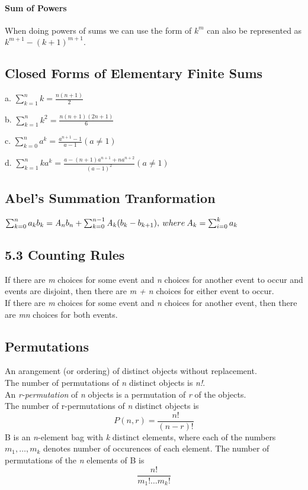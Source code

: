\documentclass[10pt,twocolumn]{article}
\newenvironment{packed_list}{
\begin{itemize}
  \setlength{\itemsep}{1pt}
  \setlength{\parskip}{0pt}
  \setlength{\parsep}{0pt}
}{\end{itemize}}
\begin{document}
	\paragraph*{Sum of Powers}
	When doing powers of sums we can use the form of $k^m$ can also be
	represented as $k^{m+1} - ( k + 1)^{m+1}.$

	\subsection*{Closed Forms of Elementary Finite Sums}
	\begin{packed_list}
        \item[a.] $\sum_{k=1}^n k = \frac{n(n+1)}{2}$
	\item[b.] $\sum_{k=1}^n k^2 = \frac{n(n+1)(2n+1)}{6}$
	\item[c.] $\sum_{k=0}^n a^k = \frac{a^{n+1} - 1}{a -1} ( a \neq
	1)$
	\item[d.] $
\sum_{k=1}^n ka^k = \frac{a - (n + 1)a^{n+1} +
	  na^{n+2}}{(a-1)^2} (a \neq 1)$
        \end{packed_list}

	\subsection*{Abel's Summation Tranformation}
	$\sum_{k=0}^n a_kb_k = \mathit{A}_nb_n + \sum_{k=0}^{n-1}
	\mathit{A}_k(b_k - b_{k+1}),\\
	  \:where\:A_k = \sum_{i=0}^k a_k$
	
	\subsection*{5.3 Counting Rules}
	If there are \textit{m} choices for some event and \textit{n}
        choices for another event to occur and events are disjoint,
        then there are \textit{m + n} choices for either event to occur. \\
	If there are \textit{m} choices for some event and \textit{n}
        choices for another event, then there are \textit{mn} choices
        for both events.
	\subsection*{Permutations}
	An arangement (or ordering) of distinct objects without replacement. \\
	The number of permutations of \textit{n} distinct objects is \textit{n!}. \\
	An \textit{r-permutation} of \textit{n} objects is a
        permutation of \textit{r} of the objects. \\
	The number of r-permutations of \textit{n} distinct objects is
	\[P(n, r)=\frac{n!}{(n - r)!}\]
	B is an \textit{n}-element bag with \textit{k} distinct
        elements, where each of the numbers $m_1,\ldots,m_k$ denotes
        number of occurences of each element.  The number of
        permutations of the \textit{n} elements of B is \[\frac{n!}{m_1! \ldots m_k!}\]
\end{document}
